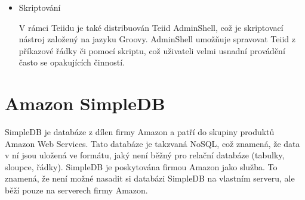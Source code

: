 \documentclass[oneside,11pt]{fithesis2}
\begin{document}
\begin{itemize}
\begin{itemize}
  Dvěmi hlavními nástroji pro monitorování a správu jsou Teiid Web Console (V zásadě jde o rozšíření webové konzole aplikačního serveru o položky pro správu a monitorování Teiid instance) a zásuvný modul pro RHQ\footnote{RQH je komunitní projekt vedený pod jboss.org pro správu více serverů, http://www.jboss.org/rhq} pro kontrolu více serverů či clusterů Teiidu.
  
  \item Skriptování
  
  V rámci Teiidu je také distribuován Teiid AdminShell, což je skriptovací nástroj založený na jazyku Groovy. AdminShell umožňuje spravovat Teiid z příkazové řádky či pomocí skriptu, což uživateli velmi usnadní provádění často se opakujících činností.
  
  \end{itemize}

\end{itemize}

\chapter{Amazon SimpleDB}
SimpleDB je databáze z dílen firmy Amazon a patří do skupiny produktů Amazon Web Services. Tato databáze je takzvaná NoSQL, což znamená, že data v ní jsou uložená ve formátu, jaký není běžný pro relační databáze (tabulky, sloupce, řádky). SimpleDB je poskytována firmou Amazon jako služba. To znamená, že není možné nasadit si databázi SimpleDB na vlastním serveru, ale běží pouze na serverech firmy Amazon. 
\end{document}
